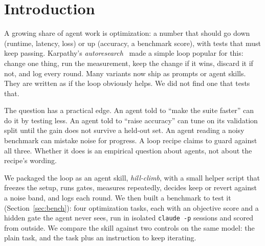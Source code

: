 \section{Introduction}
\label{sec:intro}

A growing share of agent work is optimization: a number that should go down (runtime, latency, loss) or up
(accuracy, a benchmark score), with tests that must keep passing. Karpathy's \emph{autoresearch}~\cite{autoresearch}
made a simple loop popular for this: change one thing, run the measurement, keep the change if it wins, discard
it if not, and log every round. Many variants now ship as prompts or agent skills. They are written as if the
loop obviously helps. We did not find one that tests that.

The question has a practical edge. An agent told to ``make the suite faster'' can do it by testing less. An agent
told to ``raise accuracy'' can tune on its validation split until the gain does not survive a held-out set. An
agent reading a noisy benchmark can mistake noise for progress. A loop recipe claims to guard against all three.
Whether it does is an empirical question about agents, not about the recipe's wording.

We packaged the loop as an agent skill, \emph{hill-climb}, with a small helper script that freezes the setup,
runs gates, measures repeatedly, decides keep or revert against a noise band, and logs each round. We then built a
benchmark to test it (Section~\ref{sec:bench}): four optimization tasks, each with an objective score and a
hidden gate the agent never sees, run in isolated \texttt{claude -p} sessions and scored from outside. We compare
the skill against two controls on the same model: the plain task, and the task plus an instruction to keep
iterating.

